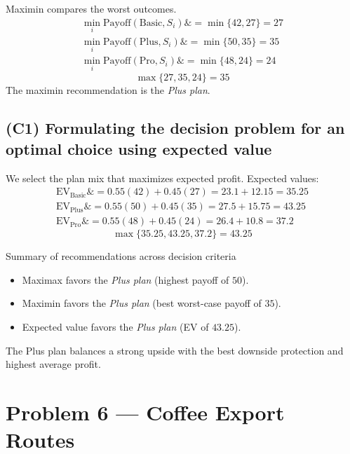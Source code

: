 \documentclass[11pt]{article}
\begin{document}
	Maximin compares the worst outcomes.
	\[
	\begin{aligned}
		\min_i \text{Payoff}(\text{Basic}, S_i) \&= \min\{42, 27\} = 27 \\
		\min_i \text{Payoff}(\text{Plus}, S_i) \&= \min\{50, 35\} = 35 \\
		\min_i \text{Payoff}(\text{Pro}, S_i) \&= \min\{48, 24\} = 24
	\end{aligned}
	\]
	\[
	\max\{27, 35, 24\} = 35
	\]
	The maximin recommendation is the \emph{Plus plan}.
	
	\subsection*{(C1) Formulating the decision problem for an optimal choice using expected value}
	
	\hypertarget{problem5-c1}{}
	
	We select the plan mix that maximizes expected profit. Expected values:
	\[
	\begin{aligned}
		\mathrm{EV}_{\text{Basic}} \&= 0.55(42) + 0.45(27) = 23.1 + 12.15 = 35.25 \\
		\mathrm{EV}_{\text{Plus}} \&= 0.55(50) + 0.45(35) = 27.5 + 15.75 = 43.25 \\
		\mathrm{EV}_{\text{Pro}} \&= 0.55(48) + 0.45(24) = 26.4 + 10.8 = 37.2
	\end{aligned}
	\]
	\[
	\max\{35.25, 43.25, 37.2\} = 43.25
	\]
	
	Summary of recommendations across decision criteria
	\begin{itemize}
		\item Maximax favors the \emph{Plus plan} (highest payoff of $50$).
		\item Maximin favors the \emph{Plus plan} (best worst-case payoff of $35$).
		\item Expected value favors the \emph{Plus plan} (EV of $43.25$).
	\end{itemize}
	
	The Plus plan balances a strong upside with the best downside protection and highest average profit.
	
	\section*{Problem 6 — Coffee Export Routes}
	
	\hypertarget{problem6}{}
	
	\hypertarget{problem6-criteria}{}
	
\end{document}

